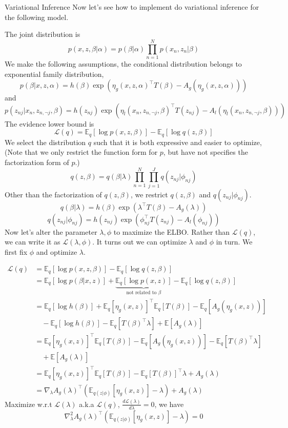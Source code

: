 \begin{frame}[allowframebreaks]{Variational Inference}
    Now let's see how to implement do variational inference for the following model.
    
    The joint distribution is 
    $$p(x,z,\beta | \alpha)=p(\beta | \alpha)\prod_{n=1}^N p(x_n,z_n | \beta)$$
    We make the following assumptions, the conditional distribution belongs to exponential family distribution,
    $$p(\beta | x,z,\alpha)=h(\beta)\exp(\eta_g (x,z,\alpha)^\top T(\beta)-A_g(\eta_g(x,z,\alpha)))$$
    and
    $$\scriptstyle p(z_{nj}|x_n,z_{n,\neg j},\beta)=h(z_{nj})\exp(\eta_l(x_n,z_{n,\neg j},\beta)^\top T(z_{nj})-A_l(\eta_l(x_n,z_{n,\neg j},\beta)))$$
    The evidence lower bound is
    $$\mathcal{L}(q)=\mathbb{E}_q[\log p(x,z,\beta)]-\mathbb{E}_q[\log q(z,\beta)]$$
    We select the distribution $q$ such that it is both expressive and easier to optimize, (Note that we only restrict the function form for $p$, but have not specifies the factorization form of $p$.)
    $$q(z,\beta)=q(\beta|\lambda)\prod_{n=1}^N \prod_{j=1}^J q(z_{nj}|\phi_{nj})$$
    Other than the factorization of $q(z,\beta)$, we restrict $q(z, \beta)$ and $q(z_{nj} | \phi_{nj})$.
    $$q(\beta | \lambda)=h(\beta)\exp(\lambda^\top T(\beta)-A_g(\lambda))$$
    $$q(z_{nj}|\phi_{nj})=h(z_{nj})\exp(\phi_{nj}^\top T(z_{nj})-A_l(\phi_{nj}))$$
    Now let's alter the parameter $\lambda, \phi$ to maximize the ELBO.
    Rather than $\mathcal{L}(q)$, we can write it as $\mathcal{L}(\lambda, \phi)$.
    It turns out we can optimize $\lambda$ and $\phi$ in turn.  We first fix $\phi$ and optimize $\lambda$. 
    
    \begin{align*}
    \mathcal{L}(q)& =\mathbb{E}_q[\log p(x,z,\beta)]-\mathbb{E}_q[\log q(z,\beta)] \\
    & = \mathbb{E}_q[\log p(\beta | x,z)] + \underbrace{\mathbb{E}_q[\log p(x,z)]}_{\text{not related to }\beta}-\mathbb{E}_q[\log q(z,\beta)] \\
    & = \mathbb{E}_q[\log h(\beta)] + \mathbb{E}_q[\eta_g (x,z)]^\top \mathbb{E}_q[T(\beta)]-\mathbb{E}_q[A_g(\eta_g(x,z))]  \\ 
    & \quad  - \mathbb{E}_q[\log h(\beta)] - \mathbb{E}_q[T(\beta)^\top \lambda] +  \mathbb{E}[A_g(\lambda)] \\
    & = \mathbb{E}_q[\eta_g (x,z)]^\top\mathbb{E}_q[T(\beta)]-\mathbb{E}_q[A_g(\eta_g(x,z))] - \mathbb{E}_q[T(\beta)^\top \lambda] \\ 
    & \quad + \mathbb{E}[A_g(\lambda)] \\ 
    & = \mathbb{E}_q[\eta_g (x,z)]^\top\mathbb{E}_q[T(\beta)] - \mathbb{E}_q[T(\beta)]^\top\lambda + A_g(\lambda) \\
    & = \nabla_\lambda A_g(\lambda)^\top(\mathbb{E}_{q(z | \phi)}[\eta_g (x,z)] - \lambda) + A_g(\lambda)
    \end{align*}
    Maximize w.r.t $\mathcal{L}(\lambda)$ a.k.a $\mathcal{L}(q)$, $\frac{d\mathcal{L}(\lambda)}{d \lambda} = 0$, we have 
    $$\nabla^2_\lambda A_g(\lambda)^\top(\mathbb{E}_{q(z | \phi)}[\eta_g (x,z)] - \lambda) = 0$$
    

\end{frame}
